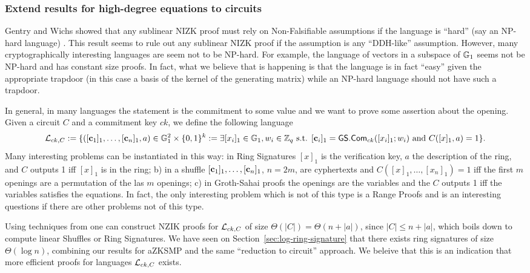 \subsubsection{Extend results for high-degree equations to circuits}
Gentry and Wichs showed that any sublinear NIZK proof must rely on Non-Falsifiable assumptions if the language is ``hard'' (say an NP-hard language) \cite{STOC:GenWic11}. This result seems to rule out any sublinear NIZK proof if the assumption is any ``DDH-like'' assumption. However, many cryptographically interesting languages are seem not to be NP-hard. For example, the language of vectors in a subspace of $\mathbb{G}_1$ seems not be NP-hard and has constant size proofs. In fact, what we believe that is happening is that the language is in fact ``easy'' given the appropriate trapdoor (in this case a basis of the kernel of the generating matrix) while an NP-hard language should not have such a trapdoor.

In general, in many languages the statement is the commitment to some value and we want to prove some assertion about the opening. Given a circuit $C$ and a commitment key $ck$, we define the following language
$$
\mathcal{L}_{ck,C}:= \{([\mathbf{c}_1]_1,\ldots,[\mathbf{c}_n]_1,a)\in\mathbb{G}_1^2\times\{0,1\}^k:= \exists [x_i]_1\in\mathbb{G}_1,w_i\in\mathbb{Z}_q \text{ s.t. } [\mathbf{c}_i]_1={\mathsf{GS}}.\mathsf{Com}_{ck}([x_i]_1;w_i)\text{ and }C([x]_1,a)=1\}.
$$
Many interesting problems can be instantiated in this way: in Ring Signatures $[x]_1$ is the verification key, $a$ the description of the ring, and $C$ outputs 1 iff $[x]_1$ is in the ring; b) in a shuffle $[\mathbf{c}_1]_1,\ldots,[\mathbf{c}_n]_1$, $n=2m$, are cyphertexts and $C([x]_1,\ldots,[x_n]_1)=1$ iff the first $m$ openings are a permutation of the las $m$ openings; c) in Groth-Sahai proofs the openings are the variables and the $C$ outputs 1 iff the variables satisfies the equations. In fact, the only interesting problem which is not of this type is a Range Proofs and is an interesting questions if there are other problems not of this type.

Using techniques from \cite{EC:GroOstSah06} one can construct NZIK proofs for $\mathcal{L}_{ck,C}$ of size $\Theta(|C|)=\Theta(n+|a|)$, since $|C|\leq n+|a|$, which boils down to compute linear Shuffles or Ring Signatures. We have seen on Section~\ref{sec:log-ring-signature} that there exists ring signatures of size $\Theta(\log n)$, combining our results for aZKSMP and the same ``reduction to circuit'' approach. We beleive that this is an indication that more efficient proofs for languages $\mathcal{L}_{ck,C}$ exists.

\fi
